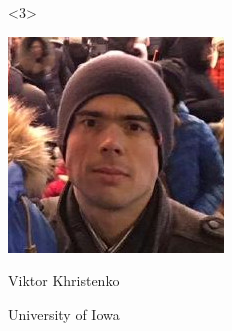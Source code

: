 \documentclass{beamer}
\begin{document}
\begin{frame}{}


\begin{onlyenv}<3>
\vspace{-3.5 cm}\hfill\begin{minipage}{3 cm}
\begin{center}
\includegraphics[width=2 cm]{viktor.jpg}

Viktor Khristenko

{\small University of Iowa}
\end{center}
\end{minipage}\hspace{1 cm}\vspace{3.5 cm}
\end{onlyenv}

\end{frame}
\end{document}
